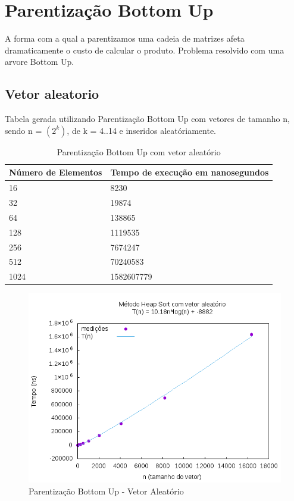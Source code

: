 \documentclass[12pt,a4paper,twoside]{report}
\begin{document}
\section{Parentização Bottom Up}

A forma com a qual a parentizamos uma cadeia de matrizes afeta dramaticamente o custo de calcular o produto. Problema resolvido com uma arvore Bottom Up.

\subsection{Vetor aleatorio}
Tabela gerada utilizando Parentização Bottom Up com vetores de tamanho n, sendo n = $(2^k)$, de k = 4..14 e inseridos aleatóriamente.
\begin{table}[H]
\centering
\caption{Parentização Bottom Up com vetor aleatório}
\label{my-label}
\begin{tabular}{|l|l|}
\hline
\multicolumn{1}{|c|}{\textbf{Número de Elementos}} & \multicolumn{1}{c|}{\textbf{Tempo de execução em nanosegundos}} \\ \hline
16 & 8230 \\ \hline
32 & 19874 \\ \hline
64 & 138865 \\ \hline
128 & 1119535 \\ \hline
256 & 7674247 \\ \hline
512 & 70240583 \\ \hline
1024 & 1582607779 \\ \hline
\end{tabular}
\end{table}

\begin{figure}[H]
    \centering
    \includegraphics[width=0.7\linewidth]{graficos/HeapSort/vIntAleatorio/vIntAleatorio.png}
  \caption{Parentização Bottom Up - Vetor Aleatório}
\end{figure}
\end{document}
